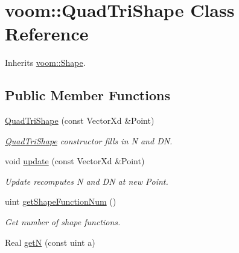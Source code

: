 \hypertarget{classvoom_1_1_quad_tri_shape}{
\section{voom::QuadTriShape Class Reference}
\label{classvoom_1_1_quad_tri_shape}
}


Inherits \hyperlink{classvoom_1_1_shape}{voom::Shape}.\subsection*{Public Member Functions}
\begin{DoxyCompactItemize}
\item 
\hypertarget{classvoom_1_1_quad_tri_shape_a3ae68091204f26676822299133a41374}{
\hyperlink{classvoom_1_1_quad_tri_shape_a3ae68091204f26676822299133a41374}{QuadTriShape} (const VectorXd \&Point)}
\label{classvoom_1_1_quad_tri_shape_a3ae68091204f26676822299133a41374}

\begin{DoxyCompactList}\small\item\em \hyperlink{classvoom_1_1_quad_tri_shape}{QuadTriShape} constructor fills in N and DN. \item\end{DoxyCompactList}\item 
void \hyperlink{classvoom_1_1_quad_tri_shape_a1e0317d601f43cced80377e60db19b49}{update} (const VectorXd \&Point)
\begin{DoxyCompactList}\small\item\em Update recomputes N and DN at new Point. \item\end{DoxyCompactList}\item 
\hypertarget{classvoom_1_1_quad_tri_shape_adb97838597d28aa935e1d745c569d41c}{
uint \hyperlink{classvoom_1_1_quad_tri_shape_adb97838597d28aa935e1d745c569d41c}{getShapeFunctionNum} ()}
\label{classvoom_1_1_quad_tri_shape_adb97838597d28aa935e1d745c569d41c}

\begin{DoxyCompactList}\small\item\em Get number of shape functions. \item\end{DoxyCompactList}\item 
\hypertarget{classvoom_1_1_quad_tri_shape_a3df0e4d3ee63ebe677221395f03b7bd4}{
Real \hyperlink{classvoom_1_1_quad_tri_shape_a3df0e4d3ee63ebe677221395f03b7bd4}{getN} (const uint a)}
\label{classvoom_1_1_quad_tri_shape_a3df0e4d3ee63ebe677221395f03b7bd4}


\end{DoxyCompactItemize}
